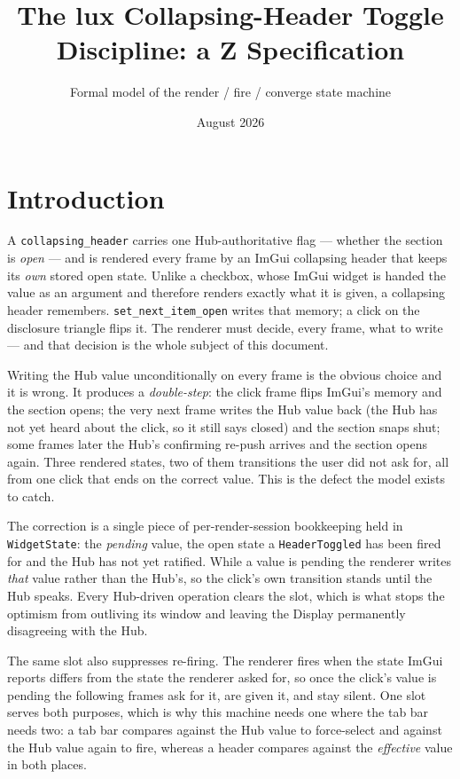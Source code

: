 \documentclass[a4paper,10pt,fleqn]{article}
\begin{document}
\title{The lux Collapsing-Header Toggle Discipline: a Z Specification}
\author{Formal model of the render / fire / converge state machine}
\date{August 2026}
\maketitle

\section{Introduction}

A \texttt{collapsing\_header} carries one Hub-authoritative flag --- whether the
section is \emph{open} --- and is rendered every frame by an ImGui collapsing
header that keeps its \emph{own} stored open state.  Unlike a checkbox, whose
ImGui widget is handed the value as an argument and therefore renders exactly
what it is given, a collapsing header remembers.  \texttt{set\_next\_item\_open}
writes that memory; a click on the disclosure triangle flips it.  The renderer
must decide, every frame, what to write --- and that decision is the whole
subject of this document.

Writing the Hub value unconditionally on every frame is the obvious choice and
it is wrong.  It produces a \emph{double-step}: the click frame flips ImGui's
memory and the section opens; the very next frame writes the Hub value back
(the Hub has not yet heard about the click, so it still says closed) and the
section snaps shut; some frames later the Hub's confirming re-push arrives and
the section opens again.  Three rendered states, two of them transitions the
user did not ask for, all from one click that ends on the correct value.  This
is the defect the model exists to catch.

The correction is a single piece of per-render-session bookkeeping held in
\texttt{WidgetState}: the \emph{pending} value, the open state a
\texttt{HeaderToggled} has been fired for and the Hub has not yet ratified.
While a value is pending the renderer writes \emph{that} value rather than the
Hub's, so the click's own transition stands until the Hub speaks.  Every
Hub-driven operation clears the slot, which is what stops the optimism from
outliving its window and leaving the Display permanently disagreeing with the
Hub.

The same slot also suppresses re-firing.  The renderer fires when the state
ImGui reports differs from the state the renderer asked for, so once the click's
value is pending the following frames ask for it, are given it, and stay silent.
One slot serves both purposes, which is why this machine needs one where the
tab bar needs two: a tab bar compares against the Hub value to force-select and
against the Hub value again to fire, whereas a header compares against the
\emph{effective} value in both places.
\end{document}
